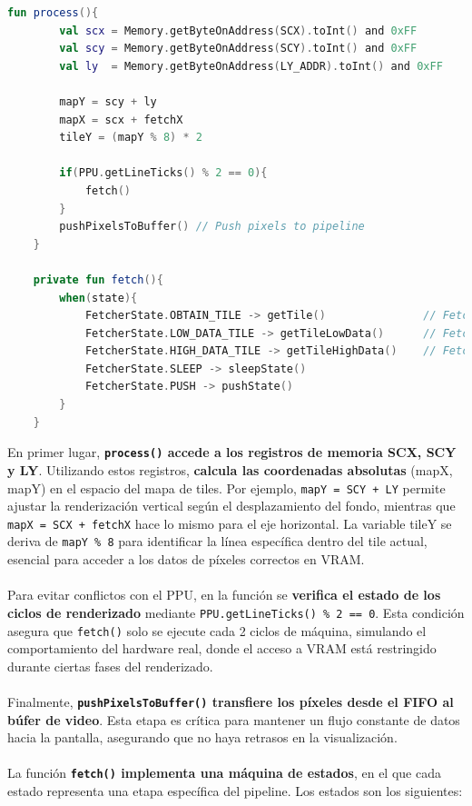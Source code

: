 \begin{lstlisting}[language=Kotlin, caption={Código principal del FIFO Fetcher.}, label={code:ppufifoprocess}]
    fun process(){
        val scx = Memory.getByteOnAddress(SCX).toInt() and 0xFF
        val scy = Memory.getByteOnAddress(SCY).toInt() and 0xFF
        val ly  = Memory.getByteOnAddress(LY_ADDR).toInt() and 0xFF

        mapY = scy + ly
        mapX = scx + fetchX
        tileY = (mapY % 8) * 2

        if(PPU.getLineTicks() % 2 == 0){
            fetch()
        }
        pushPixelsToBuffer() // Push pixels to pipeline
    }

    private fun fetch(){
        when(state){
            FetcherState.OBTAIN_TILE -> getTile()               // Fetch the current tile identification in the BG Tilemap
            FetcherState.LOW_DATA_TILE -> getTileLowData()      // Fetch the low byte of the tile
            FetcherState.HIGH_DATA_TILE -> getTileHighData()    // Fetch the high byte of the tile
            FetcherState.SLEEP -> sleepState()
            FetcherState.PUSH -> pushState()
        }
    }
\end{lstlisting}

En primer lugar, \textbf{\texttt{process()} accede a los registros de memoria SCX, SCY y LY}. Utilizando estos registros, \textbf{calcula las coordenadas absolutas} (mapX, mapY) en el espacio del mapa de tiles. Por ejemplo, \texttt{mapY = SCY + LY} permite ajustar la renderización vertical según el desplazamiento del fondo, mientras que \texttt{mapX = SCX + fetchX} hace lo mismo para el eje horizontal. La variable tileY se deriva de \texttt{mapY \% 8} para identificar la línea específica dentro del tile actual, esencial para acceder a los datos de píxeles correctos en VRAM.
\\\\
Para evitar conflictos con el PPU, en la función se \textbf{verifica el estado de los ciclos de renderizado} mediante \texttt{PPU.getLineTicks() \% 2 == 0}. Esta condición asegura que \texttt{fetch()} solo se ejecute cada 2 ciclos de máquina, simulando el comportamiento del hardware real, donde el acceso a VRAM está restringido durante ciertas fases del renderizado.
\\\\
Finalmente, \textbf{\texttt{pushPixelsToBuffer()} transfiere los píxeles desde el FIFO al búfer de video}. Esta etapa es crítica para mantener un flujo constante de datos hacia la pantalla, asegurando que no haya retrasos en la visualización.
\\\\
La función \textbf{\texttt{fetch()} implementa una máquina de estados}, en el que cada estado representa una etapa específica del pipeline. Los estados son los siguientes:

